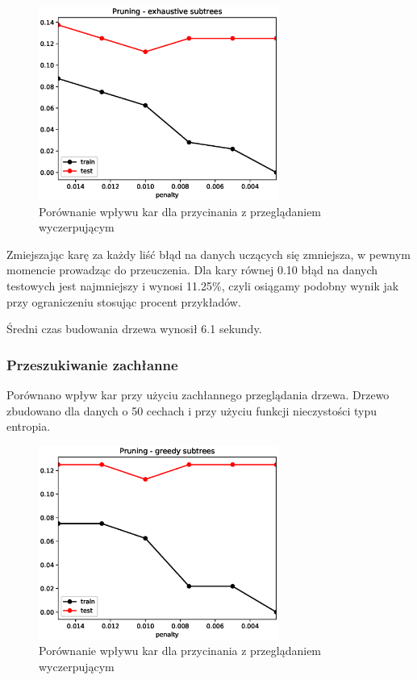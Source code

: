 \documentclass[11pt]{article}
\begin{document}
\begin{figure}[H]
\center
\includegraphics[width=0.7\textwidth]{pruning_exhaustive}
\caption{Porównanie wpływu kar dla przycinania z przeglądaniem wyczerpującym}
\end{figure}


Zmiejszając karę za każdy liść błąd na danych uczących się zmniejsza, w pewnym momencie prowadząc do przeuczenia. Dla kary równej 0.10 błąd na danych testowych jest najmniejszy i wynosi 11.25\%, czyli osiągamy podobny wynik jak przy ograniczeniu stosując procent przykładów.

Średni czas budowania drzewa wynosił 6.1 sekundy.

\subsubsection{Przeszukiwanie zachłanne}

Porównano wpływ kar przy użyciu zachłannego przeglądania drzewa. Drzewo zbudowano dla danych o 50 cechach i przy użyciu funkcji nieczystości typu entropia.

\begin{figure}[H]
\center
\includegraphics[width=0.7\textwidth]{pruning_greedy}
\caption{Porównanie wpływu kar dla przycinania z przeglądaniem wyczerpującym}
\end{figure}
\end{document}

